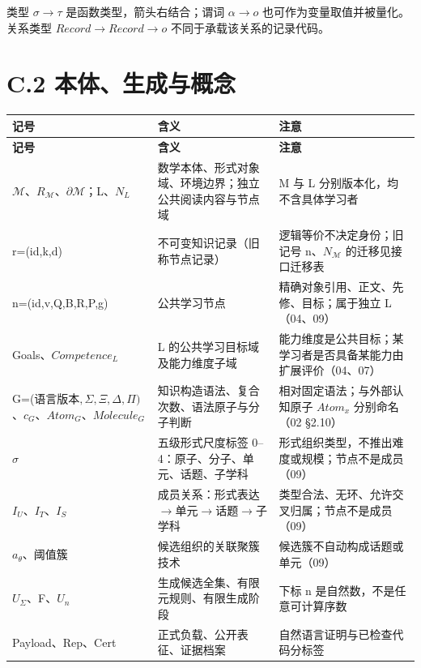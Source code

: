 \documentclass[UTF8,a4paper,zihao=-4,fontset=windows,openany]{ctexbook}
\def\mathrm#1{#1}%
\begin{document}
类型 \(\sigma\to\tau\) 是函数类型，箭头右结合；谓词 \(\alpha\to o\) 也可作为变量取值并被量化。关系类型 \(\mathrm{Record}\to\mathrm{Record}\to o\) 不同于承载该关系的记录代码。

\section{C.2 本体、生成与概念}
\begingroup\small\setlength{\tabcolsep}{4pt}
\begin{longtable}{>{\raggedright\arraybackslash}p{}>{\raggedright\arraybackslash}p{}>{\raggedright\arraybackslash}p{}}
\toprule
\textbf{记号} & \textbf{含义} & \textbf{注意} \\
\midrule
\endfirsthead
\toprule
\textbf{记号} & \textbf{含义} & \textbf{注意} \\
\midrule
\endhead
\bottomrule
\endfoot
\bottomrule
\endlastfoot
\(\mathcal{M}\)、\(R_\mathcal{M}\)、\(\partial\mathcal{M}\)；L、\(N_L\) & 数学本体、形式对象域、环境边界；独立公共阅读内容与节点域 & M 与 L 分别版本化，均不含具体学习者 \\
r=(id,k,d) & 不可变知识记录（旧称节点记录） & 逻辑等价不决定身份；旧记号 n、\(N_\mathcal{M}\) 的迁移见接口迁移表 \\
n=(id,v,Q,B,R,P,g) & 公共学习节点 & 精确对象引用、正文、先修、目标；属于独立 L（04、09） \\
Goals、\(\mathrm{Competence}_L\) & L 的公共学习目标域及能力维度子域 & 能力维度是公共目标；某学习者是否具备某能力由扩展评价（04、07） \\
G=(语言版本\(,\Sigma,\Xi,\Delta,\Pi)\)、\(c_G\)、\(\mathrm{Atom}_G\)、\(\mathrm{Molecule}_G\) & 知识构造语法、复合次数、语法原子与分子判断 & 相对固定语法；与外部认知原子 \(\mathrm{Atom}_x\) 分别命名（02 §2.10） \\
\(\sigma\) & 五级形式尺度标签 0–4：原子、分子、单元、话题、子学科 & 形式组织类型，不推出难度或规模；节点不是成员（09） \\
\(I_U\)、\(I_T\)、\(I_S\) & 成员关系：形式表达\(\to\)单元\(\to\)话题\(\to\)子学科 & 类型合法、无环、允许交叉归属；节点不是成员（09） \\
\(a_\theta\)、阈值簇 & 候选组织的关联聚簇技术 & 候选簇不自动构成话题或单元（09） \\
\(U_\Sigma\)、F、\(U_n\) & 生成候选全集、有限元规则、有限生成阶段 & 下标 n 是自然数，不是任意可计算序数 \\
Payload、Rep、Cert & 正式负载、公开表征、证据档案 & 自然语言证明与已检查代码分标签 \\

\end{longtable}
\end{document}
